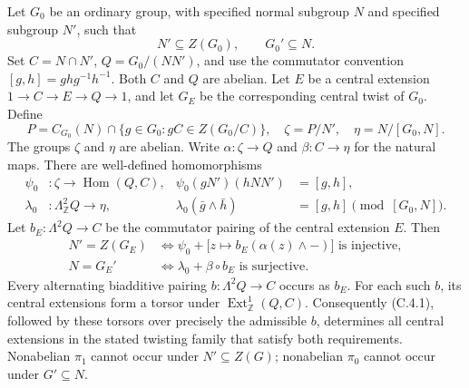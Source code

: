 \begin{theorem}
\label{C:central_twists}
Let $G_0$ be an ordinary group, with specified normal subgroup $N$ and
specified subgroup $N'$, such that
\[
 N'\subseteq Z(G_0),\qquad G_0'\subseteq N.
\]
Set $C=N\cap N'$, $Q=G_0/(NN')$, and use the commutator convention
$[g,h]=ghg^{-1}h^{-1}$. Both $C$ and $Q$ are abelian. Let
$E$ be a central extension $1\to C\to E\to Q\to1$, and let $G_E$ be the
corresponding central twist of $G_0$. Define
\[
 P=C_{G_0}(N)\cap\{g\in G_0:gC\in Z(G_0/C)\},\quad
 \zeta=P/N',\quad \eta=N/[G_0,N].
\]
The groups $\zeta$ and $\eta$ are abelian. Write $\alpha:\zeta\to Q$ and $\beta:C\to\eta$
for the natural maps. There are well-defined homomorphisms
\[
 \begin{aligned}
 \psi_0&:\zeta\longrightarrow\operatorname{Hom}(Q,C),
       &\psi_0(gN')(hNN')&=[g,h],\\
 \lambda_0&:\Lambda^2_{\mathbb Z}Q\longrightarrow\eta,
       &\lambda_0(\bar g\wedge\bar h)&=[g,h]\pmod{[G_0,N]}.
 \end{aligned}
\]
Let $b_E:\Lambda^2Q\to C$ be the commutator pairing of the central
extension $E$. Then
\[
 \boxed{\quad
 \begin{aligned}
 N'=Z(G_E)&\iff
   \psi_0+\bigl[z\mapsto b_E(\alpha(z)\wedge-)\bigr]
          \text{ is injective},\\
 N=G_E'&\iff \lambda_0+\beta\circ b_E
          \text{ is surjective}.
 \end{aligned}\quad}                                      \tag{C.4.1}
\]
Every alternating biadditive pairing $b:\Lambda^2Q\to C$ occurs as $b_E$.
For each such $b$, its central extensions form a torsor under
$\operatorname{Ext}^1_{\mathbb Z}(Q,C)$. Consequently (C.4.1), followed by
these torsors over precisely the admissible $b$, determines all central
extensions in the stated twisting family that satisfy both requirements.
Nonabelian $\pi_1$ cannot occur under $N'\subseteq Z(G)$; nonabelian
$\pi_0$ cannot occur under $G'\subseteq N$.
\end{theorem}
